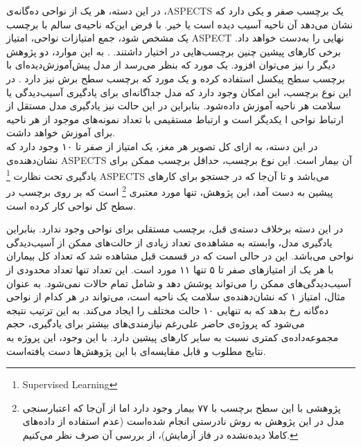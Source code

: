 در این دسته، 
هر یک از نواحی ده‌گانه‌ی ،ASPECTS
یک برچسب صفر و یکی دارد که نشان می‌دهد آن ناحیه آسیب دیده است یا خیر.
با فرض این‌که ناحیه‌ی سالم با برچسب یک مشخص شود، جمع امتیازات نواحی، امتیاز ASPECT نهایی را به‌دست خواهد داد.
برخی کار‌های پیشین
چنین برچسب‌هایی در اختیار داشتند.
\cite{lee2023clinical,jung2018evaluating,kuang2019automated}.
به این موارد، دو پژوهش دیگر را نیز می‌توان افزود.
یک مورد که بنظر می‌رسد از مدل پیش‌آموزش‌دیده‌ای با برچسب سطح پیکسل استفاده کرده 
\cite{naganuma2021alberta}
و یک مورد که برچسب سطح برش نیز دارد \cite{chiang2022deep}.
در این نوع برچسب، این امکان وجود دارد که مدل جداگانه‌ای برای یادگیری
آسیب‌دیدگی یا سلامت هر ناحیه آموزش داده‌شود.
بنابراین در این حالت نیز یادگیری مدل مستقل از ارتباط نواحی ا یکدیگر است و ارتباط مستقیمی با تعداد نمونه‌های موجود از هر ناحیه برای آموزش خواهد داشت.\\

در این دسته، به ازای کل تصویر هر مغز، 
یک امتیاز از صفر تا ۱۰ وجود دارد که نشان‌دهنده‌ی ASPECTS آن بیمار است.
این نوع برچسب، حداقل برچسب ممکن برای یادگیری تحت نظارت
\footnote{Supervised Learning} 
ASPECTS می‌باشد و
تا آن‌جا که در جستجو برای کار‌های پیشین به دست آمد، این پژوهش، تنها مورد معتبری
\footnote{پژوهشی با این سطح برچسب با ۷۷ بیمار وجود دارد 
\cite{golkonda2022automated}
اما از آن‌جا که اعتبارسنجی مدل در این پژوهش به روش نادرستی انجام شده‌است (عدم استفاده از داده‌های کاملا دیده‌نشده در فاز آزمایش)، از بررسی آن صرف نظر می‌کنیم.}
است که بر روی برچسب در سطح کل نواحی کار کرده است.\


در این دسته برخلاف دسته‌ی قبل، برچسب  مستقلی برای نواحی وجود ندارد.
بنابراین 
یادگیری مدل، وابسته به مشاهده‌ی تعداد زیادی از حالت‌های ممکن از آسیب‌دیدگی نواحی می‌باشد.
این در حالی است که در قسمت قبل مشاهده شد که تعداد کل بیماران با هر یک از امتیازهای صفر تا ۵ تنها ۱۱ مورد است.
این تعداد تنها تعداد محدودی از آسیب‌دیدگی‌های ممکن را می‌تواند پوشش دهد و شامل تمام حالات نمی‌شود. 
به عنوان مثال، امتیاز ۱ که نشان‌دهنده‌ی سلامت یک ناحیه است، می‌تواند در هر کدام از نواحی ده‌گانه رخ بدهد که به تنهایی ۱۰ حالت مختلف را ایجاد می‌کند. 
به این ترتیب نتیجه می‌شود که پروژه‌ی حاضر علی‌رغم نیازمندی‌های بیشتر برای یادگیری، حجم مجموعه‌داده‌ی کمتری نسبت به سایر کار‌های پیشین دارد.
با این وجود، این پروژه به نتایج مطلوب و قابل مقایسه‌ای با این پژوهش‌ها دست یافته‌است.
